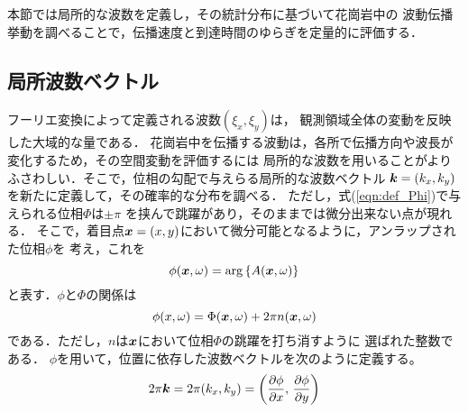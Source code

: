 ﻿本節では局所的な波数を定義し，その統計分布に基づいて花崗岩中の
波動伝播挙動を調べることで，伝播速度と到達時間のゆらぎを定量的に評価する．
\subsection{局所波数ベクトル}
フーリエ変換によって定義される波数$(\xi_x,\xi_y)$は， 観測領域全体の変動を反映した大域的な量である．
花崗岩中を伝播する波動は，各所で伝播方向や波長が変化するため，その空間変動を評価するには
局所的な波数を用いることがよりふさわしい．そこで，位相の勾配で与えらる局所的な波数ベクトル
$\mbox{\boldmath{$k$}}=(k_x,k_y)$を新たに定義して，その確率的な分布を調べる．
ただし，式(\ref{eqn:def_Phi})で与えられる位相$\Phi$は$\pm \pi$
を挟んで跳躍があり，そのままでは微分出来ない点が現れる．
そこで，着目点$\mbox{\boldmath{$x$}}=(x,y)$において微分可能となるように，アンラップされた位相$\phi$を
考え，これを
\begin{equation}
	\phi(\fat{x},\omega)=\arg\left\{  A(\fat{x},\omega) \right\}
	\label{eqn:def_phi}
\end{equation}
と表す．$\phi$と$\Phi$の関係は
\begin{equation}
	\phi(x,\omega)=\Phi(\fat{x},\omega) + 2\pi n(\fat{x},\omega )
	\label{eqn:}
\end{equation}
である．ただし，$n$は$\mbox{\boldmath{$x$}}$において位相$\Phi$の跳躍を打ち消すように
選ばれた整数である．
$\phi$を用いて，位置に依存した波数ベクトルを次のように定義する。
\begin{equation}
	2\pi \fat{k}= 
	2\pi (k_x,k_y)=
	\left(
		\frac{\partial \phi}{\partial x}
		, \, 
		\frac{\partial \phi}{\partial y} 
	\right)
	\label{eqn:}
\end{equation}
